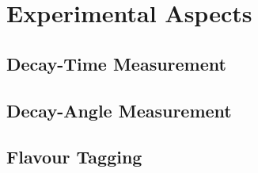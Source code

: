 \chapter{Experimental Aspects}
\label{chap:exp}


\section{Decay-Time Measurement}
\label{sec:exp_time}
\section{Decay-Angle Measurement}
\label{sec:exp_angles}
\section{Flavour Tagging}
\label{sec:exp_tagging}
